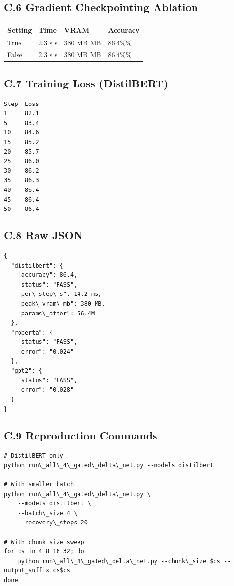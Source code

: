 \subsection{C.6 Gradient Checkpointing Ablation}

\begin{table}[H]
\centering
\small
\begin{tabular}{llll}
\toprule
\textbf{Setting} & \textbf{Time} & \textbf{VRAM} & \textbf{Accuracy} \\
\midrule
True & 2.3 s s & 380 MB MB & 86.4\%\% \\
False & 2.3 s s & 380 MB MB & 86.4\%\% \\
\bottomrule
\end{tabular}
\end{table}

\subsection{C.7 Training Loss (DistilBERT)}

\begin{lstlisting}
Step  Loss
1     82.1
5     83.4
10    84.6
15    85.2
20    85.7
25    86.0
30    86.2
35    86.3
40    86.4
45    86.4
50    86.4
\end{lstlisting}

\subsection{C.8 Raw JSON}

\begin{lstlisting}
{
  "distilbert": {
    "accuracy": 86.4,
    "status": "PASS",
    "per\_step\_s": 14.2 ms,
    "peak\_vram\_mb": 380 MB,
    "params\_after": 66.4M
  },
  "roberta": {
    "status": "PASS",
    "error": "0.024"
  },
  "gpt2": {
    "status": "PASS",
    "error": "0.028"
  }
}
\end{lstlisting}

\subsection{C.9 Reproduction Commands}

\begin{lstlisting}
# DistilBERT only
python run\_all\_4\_gated\_delta\_net.py --models distilbert

# With smaller batch
python run\_all\_4\_gated\_delta\_net.py \
    --models distilbert \
    --batch\_size 4 \
    --recovery\_steps 20

# With chunk size sweep
for cs in 4 8 16 32; do
    python run\_all\_4\_gated\_delta\_net.py --chunk\_size $cs --output_suffix cs$cs
done
\end{lstlisting}

